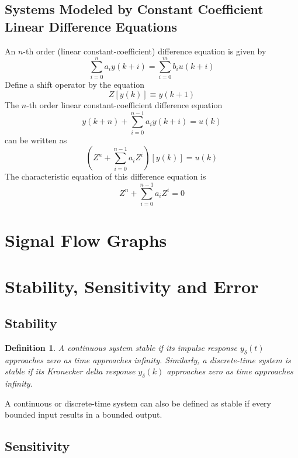 \documentclass[11pt]{book}
\theoremstyle{example}
\newtheorem{definition}{Definition}[section]
\begin{document}
\subsection{Systems Modeled by Constant Coefficient Linear Difference Equations}

An $n$-th order (linear constant-coefficient) difference equation is given by
\begin{equation}
	\sum_{i=0}^n{a_iy(k+i)}=\sum_{i=0}^m{b_iu(k+i)}
\end{equation}
Define a shift operator by the equation
\begin{equation}
	Z[y(k)]\equiv{y(k+1)}
\end{equation}
The $n$-th order linear constant-coefficient difference equation
\begin{equation}
	y(k+n)+\sum_{i=0}^{n-1}{a_iy(k+i)}=u(k)
\end{equation}
can be written as
\begin{equation}
	(Z^n+\sum_{i=0}^{n-1}{a_iZ^i})[y(k)]=u(k)
\end{equation}
The characteristic equation of this difference equation is
\begin{equation}
	Z^n+\sum_{i=0}^{n-1}{a_iZ^i}=0
\end{equation}

\section{Signal Flow Graphs}

\section{Stability, Sensitivity and Error}

\subsection{Stability}

\begin{definition} A continuous system \emph{stable} if its impulse response $y_\delta(t)$ approaches zero as time approaches infinity. Similarly, a discrete-time system is stable if its Kronecker delta response $y_\delta(k)$ approaches zero as time approaches infinity.\end{definition}

A continuous or discrete-time system can also be defined as stable if every bounded input results in a bounded output.

\subsection{Sensitivity}
\end{document}
